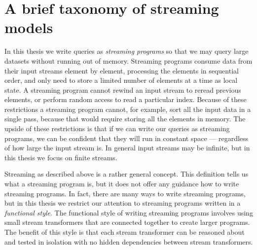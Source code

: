 \chapter{A brief taxonomy of streaming models}
\label{taxonomy}

In this thesis we write queries as \emph{streaming programs} so that we may query large datasets without running out of memory.
Streaming programs consume data from their input streams element by element, processing the elements in sequential order, and only need to store a limited number of elements at a time as local state.
A streaming program cannot rewind an input stream to reread previous elements, or perform random access to read a particular index.
Because of these restrictions a streaming program cannot, for example, sort all the input data in a single pass, because that would require storing all the elements in memory.
The upside of these restrictions is that if we can write our queries as streaming programs, we can be confident that they will run in constant space --- regardless of how large the input stream is.
In general input streams may be infinite, but in this thesis we focus on finite streams.


Streaming as described above is a rather general concept.
This definition tells us what a streaming program is, but it does not offer any guidance how to write streaming programs.
In fact, there are many ways to write streaming programs, but in this thesis we restrict our attention to streaming programs written in a \emph{functional style}.
The functional style of writing streaming programs involves using small stream transformers that are connected together to create larger programs.
The benefit of this style is that each stream transformer can be reasoned about and tested in isolation with no hidden dependencies between stream transformers.

